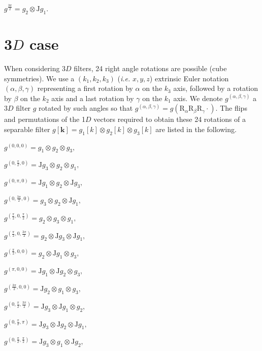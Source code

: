 \documentclass[fleqn,a4paper,oneside,openany]{book}
\begin{document}
$g^{\frac{3\pi}{2}}= g_{2}\otimes \mathrm{J} g_{1}.$


\section{3$D$ case}
When considering 3$D$ filters, 24 right angle rotations are possible (cube symmetries). 
We use a $(k_1,k_2,k_3)$ (\textit{i.e.} $x,y,z$) extrinsic Euler notation $(\alpha,\beta,\gamma)$ representing a first rotation by $\alpha$ on the $k_3$ axis, followed by a rotation by $\beta$ on the $k_2$ axis and a last rotation by $\gamma$ on the $k_1$ axis.
We denote $g^{(\alpha,\beta,\gamma)}$ a 3$D$ filter $g$ rotated by such angles so that $g^{(\alpha,\beta,\gamma)} = g(\mathrm{R}_{\alpha}\mathrm{R}_{\beta}\mathrm{R}_{\gamma}\cdot)$.
The flips and permutations of the 1$D$ vectors required to obtain these 24 rotations of a separable filter $g[\boldsymbol{k}]= g_{1}[k]\otimes g_{2}[k]\otimes g_{3}[k]$ are listed in the following.

$g^{(0,0,0)}= g_{1}\otimes g_{2}\otimes g_{3},$

$g^{(0,\frac{\pi}{2},0)}= \mathrm{J}g_{3}\otimes g_{2}\otimes g_{1},$

$g^{(0,\pi,0)}= \mathrm{J}g_{1}\otimes g_{2}\otimes \mathrm{J}g_{3},$

$g^{(0,\frac{3\pi}{2},0)}= g_{3}\otimes g_{2}\otimes \mathrm{J}g_{1},$

$g^{(\frac{\pi}{2},0,\frac{\pi}{2})}= g_{2}\otimes g_{3}\otimes g_{1},$

$g^{(\frac{\pi}{2},0,\frac{3\pi}{2})}= g_{2}\otimes \mathrm{J}g_{3}\otimes \mathrm{J}g_{1},$

$g^{(\frac{\pi}{2},0,0)}= g_{2}\otimes \mathrm{J}g_{1}\otimes g_{3},$

$g^{(\pi,0,0)}= \mathrm{J}g_{1} \otimes \mathrm{J}g_{2}\otimes g_{3},$

$g^{(\frac{3\pi}{2},0,0)}= \mathrm{J}g_{2}\otimes g_{1}\otimes g_{3},$

$g^{(0,\frac{\pi}{2},\frac{3\pi}{2})}= \mathrm{J}g_{3}\otimes \mathrm{J}g_{1}\otimes g_{2},$

$g^{(0,\frac{\pi}{2},\pi)}= \mathrm{J}g_{3}\otimes \mathrm{J}g_{2}\otimes \mathrm{J}g_{1},$

$g^{(0,\frac{\pi}{2},\frac{\pi}{2})}= \mathrm{J}g_{3}\otimes g_{1}\otimes \mathrm{J}g_{2},$
\end{document}
